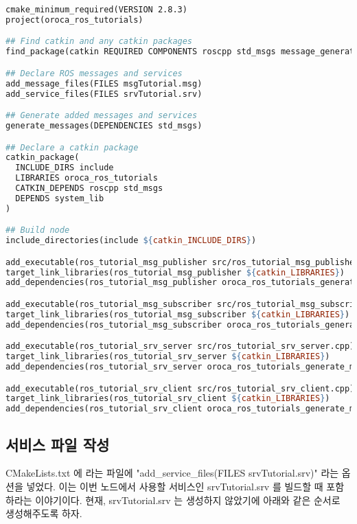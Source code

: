 \begin{lstlisting}[language=make]
cmake_minimum_required(VERSION 2.8.3)
project(oroca_ros_tutorials)

## Find catkin and any catkin packages
find_package(catkin REQUIRED COMPONENTS roscpp std_msgs message_generation)

## Declare ROS messages and services
add_message_files(FILES msgTutorial.msg)
add_service_files(FILES srvTutorial.srv)

## Generate added messages and services
generate_messages(DEPENDENCIES std_msgs)

## Declare a catkin package
catkin_package(
  INCLUDE_DIRS include
  LIBRARIES oroca_ros_tutorials
  CATKIN_DEPENDS roscpp std_msgs
  DEPENDS system_lib
)

## Build node
include_directories(include ${catkin_INCLUDE_DIRS})

add_executable(ros_tutorial_msg_publisher src/ros_tutorial_msg_publisher.cpp)
target_link_libraries(ros_tutorial_msg_publisher ${catkin_LIBRARIES})
add_dependencies(ros_tutorial_msg_publisher oroca_ros_tutorials_generate_messages_cpp)

add_executable(ros_tutorial_msg_subscriber src/ros_tutorial_msg_subscriber.cpp)
target_link_libraries(ros_tutorial_msg_subscriber ${catkin_LIBRARIES})
add_dependencies(ros_tutorial_msg_subscriber oroca_ros_tutorials_generate_messages_cpp)

add_executable(ros_tutorial_srv_server src/ros_tutorial_srv_server.cpp)
target_link_libraries(ros_tutorial_srv_server ${catkin_LIBRARIES})
add_dependencies(ros_tutorial_srv_server oroca_ros_tutorials_generate_messages_cpp)

add_executable(ros_tutorial_srv_client src/ros_tutorial_srv_client.cpp)
target_link_libraries(ros_tutorial_srv_client ${catkin_LIBRARIES})
add_dependencies(ros_tutorial_srv_client oroca_ros_tutorials_generate_messages_cpp)
\end{lstlisting}

\subsection{서비스 파일 작성}

CMakeLists.txt 에 라는 파일에 "add\_service\_files(FILES srvTutorial.srv)" 라는 옵션을 넣었다. 이는 이번 노드에서 사용할 서비스인 srvTutorial.srv 를 빌드할 때 포함하라는 이야기이다. 현재, srvTutorial.srv 는 생성하지 않았기에 아래와 같은 순서로 생성해주도록 하자.


